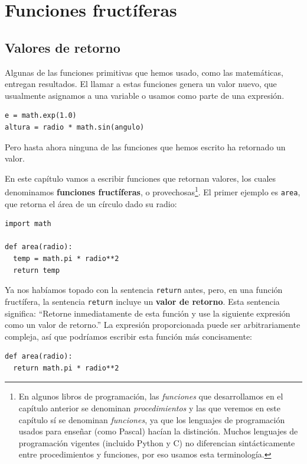 
\chapter{Funciones fructíferas }

\label{funcReturn}

\section{Valores de retorno}


Algunas de las funciones primitivas que hemos usado, como las matemáticas,
entregan resultados. El llamar a estas funciones genera un valor nuevo,
que usualmente asignamos a una variable o usamos como parte de una
expresión.
\begin{verbatim}
e = math.exp(1.0)
altura = radio * math.sin(angulo)
\end{verbatim}

Pero hasta ahora ninguna de las funciones que hemos escrito ha retornado
un valor.

En este capítulo vamos a escribir funciones que retornan valores,
los cuales denominamos \textbf{funciones fructíferas}, o provechosas\footnote{En algunos libros de programación, las \textit{funciones} que desarrollamos
en el capítulo anterior se denominan \textit{procedimientos} y las
que veremos en este capítulo sí se denominan \textit{funciones}, ya
que los lenguajes de programación usados para enseñar (como Pascal)
hacían la distinción. Muchos lenguajes de programación vigentes (incluido
Python y C) no diferencian sintácticamente entre procedimientos y
funciones, por eso usamos esta terminología.}. El primer ejemplo es \texttt{area}, que retorna el área de un círculo
dado su radio:
\begin{verbatim}
import math

def area(radio):
  temp = math.pi * radio**2
  return temp
\end{verbatim}

Ya nos habíamos topado con la sentencia \texttt{return} antes, pero,
en una función fructífera, la sentencia \texttt{return} incluye un
\textbf{valor de retorno}. Esta sentencia significa: ``Retorne inmediatamente
de esta función y use la siguiente expresión como un valor de retorno.''
La expresión proporcionada puede ser arbitrariamente compleja, así
que podríamos escribir esta función más concisamente:

\begin{verbatim}
def area(radio):
  return math.pi * radio**2
\end{verbatim}
 

